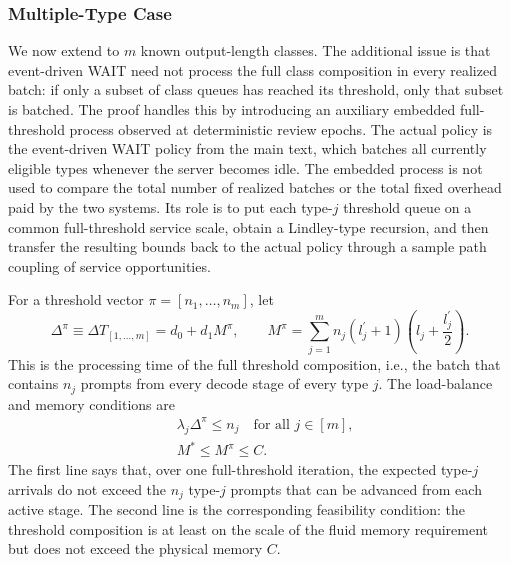 \subsubsection{Multiple-Type Case}

We now extend to \(m\) known output-length classes. The additional issue is that event-driven WAIT need not process the full class composition in every realized batch: if only a subset of class queues has reached its threshold, only that subset is batched. The proof handles this by introducing an auxiliary embedded full-threshold process observed at deterministic review epochs. The actual policy is the event-driven WAIT policy from the main text, which batches all currently eligible types whenever the server becomes idle. The embedded process is not used to compare the total number of realized batches or the total fixed overhead paid by the two systems. Its role is to put each type-\(j\) threshold queue on a common full-threshold service scale, obtain a Lindley-type recursion, and then transfer the resulting bounds back to the actual policy through a sample path coupling of service opportunities.

For a threshold vector \(\pi=[n_1,\ldots,n_m]\), let
\begin{equation}\label{eq:batch_time_def}
\Delta^\pi \equiv \Delta T_{[1,\ldots,m]}
    =  d_0 + d_1 M^\pi,\qquad
M^\pi = \sum_{j=1}^m n_j(l_j^\prime+1)\left( l_j+\frac{l_j^\prime}{2} \right).
\end{equation}
This is the processing time of the full threshold composition, i.e., the batch that contains \(n_j\) prompts from every decode stage of every type \(j\). The load-balance and memory conditions are
\begin{equation}\label{eq:policy_constraints}
\begin{aligned}
&\lambda_j\Delta^\pi \leq n_j \quad \text{for all } j \in [m], \\
&M^{*}\leq M^\pi\leq C.
\end{aligned}
\end{equation}
The first line says that, over one full-threshold iteration, the expected type-\(j\) arrivals do not exceed the \(n_j\) type-\(j\) prompts that can be advanced from each active stage. The second line is the corresponding feasibility condition: the threshold composition is at least on the scale of the fluid memory requirement but does not exceed the physical memory \(C\).

